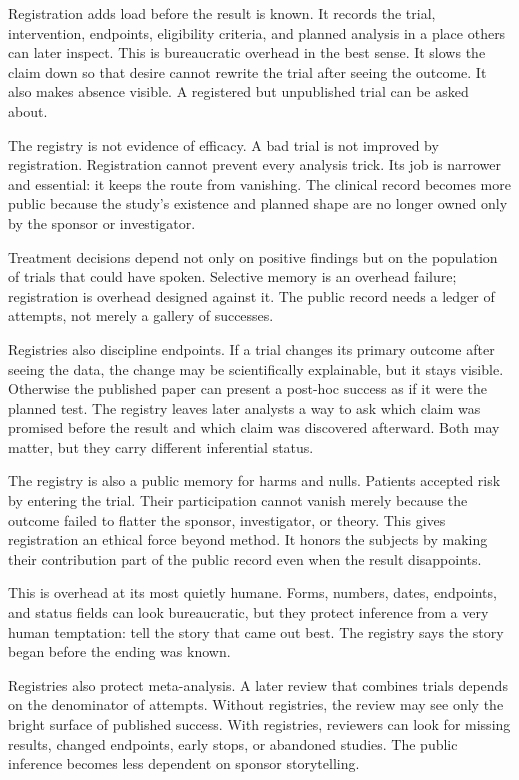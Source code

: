 Registration adds load before the result is known. It records the trial,
intervention, endpoints, eligibility criteria, and planned analysis in a place
others can later inspect. This is bureaucratic overhead in the best sense. It
slows the claim down so that desire cannot rewrite the trial after seeing the
outcome. It also makes absence visible. A registered but unpublished trial can
be asked about.

The registry is not evidence of efficacy. A bad trial is not improved by
registration. Registration cannot prevent every analysis trick. Its job is
narrower and essential: it keeps the route from vanishing. The clinical record becomes more
public because the study's existence and planned shape are no longer owned
only by the sponsor or investigator.

Treatment decisions depend not only on positive findings but on the
population of trials that could have spoken. Selective memory is an overhead failure; registration is overhead
designed against it. The public record needs a ledger of attempts, not merely
a gallery of successes.

Registries also discipline endpoints. If a trial changes its primary outcome
after seeing the data, the change may be scientifically explainable, but it
stays visible. Otherwise the published paper can present a post-hoc success
as if it were the planned test. The registry leaves later analysts a way to
ask which claim was promised before the result and which claim was discovered
afterward. Both may matter, but they carry different inferential status.

The registry is also a public memory for harms and nulls. Patients accepted
risk by entering the trial. Their participation cannot vanish merely because
the outcome failed to flatter the sponsor, investigator, or theory. This gives
registration an ethical force beyond method. It honors the subjects by making
their contribution part of the public record even when the result disappoints.

This is overhead at its most quietly humane. Forms, numbers, dates, endpoints,
and status fields can look bureaucratic, but they protect inference from a
very human temptation: tell the story that came out best. The registry says
the story began before the ending was known.

Registries also protect meta-analysis. A later review that combines trials
depends on the denominator of attempts. Without registries, the review may
see only the bright surface of published success. With registries, reviewers
can look for missing results, changed endpoints, early stops, or abandoned
studies. The public inference becomes less dependent on sponsor storytelling.

